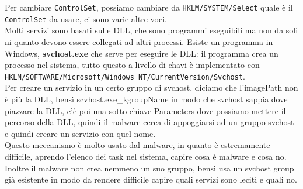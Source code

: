 \documentclass[12pt, oneside]{extbook}
\begin{document}
Per cambiare \texttt{ControlSet}, possiamo cambiare da \texttt{HKLM/SYSTEM/Select} quale è il \texttt{ControlSet} da usare, ci sono varie altre voci.\\Molti servizi sono basati sulle DLL, che sono programmi eseguibili ma non da soli ni quanto devono essere collegati ad altri processi. Esiste un programma in Windows, \textbf{svchost.exe} che serve per eseguire le DLL: il programma crea un processo nel sistema, tutto questo a livello di chavi è implementato con \texttt{HKLM/SOFTWARE/Microsoft/Windows NT/CurrentVersion/Svchost}.\\Per creare un servizio in un certo gruppo di svchost, diciamo che l'imagePath non è più la DLL, bensì scvhost.exe\_kgroupName in modo che svchost sappia dove piazzare la DLL, c'è poi una sotto-chiave Parameters dove possiamo mettere il percorso della DLL, quindi il malware cerca di appoggiarsi ad un gruppo svchost e quindi creare un servizio con quel nome.\\Questo meccanismo è molto usato dal malware, in quanto è estremamente difficile, aprendo l'elenco dei task nel sistema, capire cosa è malware e cosa no. Inoltre il malware non crea nemmeno un suo gruppo, bensì usa un svchost group già esistente in modo da rendere difficile capire quali servizi sono leciti e quali no.
\end{document}
